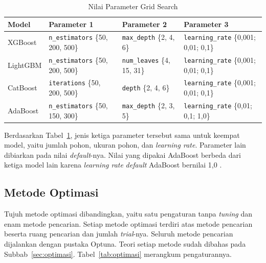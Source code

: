 \begin{table}[htbp]
  \caption{Nilai Parameter Grid Search}
  \label{tab:grid}
  \centering
  \begingroup
  \footnotesize
  \setlength{\tabcolsep}{3pt}
  \begin{tabular}{|>{\raggedright\arraybackslash}p{}%
                  |>{\raggedright\arraybackslash}p{}%
                  |>{\raggedright\arraybackslash}p{}%
                  |>{\raggedright\arraybackslash}p{}|}
    \hline
    \textbf{Model} & \textbf{Parameter 1} & \textbf{Parameter 2} &
    \textbf{Parameter 3} \\
    \hline
    XGBoost & \texttt{n\_estimators} \{50, 200, 500\} &
    \texttt{max\_depth} \{2, 4, 6\} &
    \texttt{learning\_rate} \{0,001; 0,01; 0,1\} \\
    \hline
    LightGBM & \texttt{n\_estimators} \{50, 200, 500\} &
    \texttt{num\_leaves} \{4, 15, 31\} &
    \texttt{learning\_rate} \{0,001; 0,01; 0,1\} \\
    \hline
    CatBoost & \texttt{iterations} \{50, 200, 500\} &
    \texttt{depth} \{2, 4, 6\} &
    \texttt{learning\_rate} \{0,001; 0,01; 0,1\} \\
    \hline
    AdaBoost & \texttt{n\_estimators} \{50, 150, 300\} &
    \texttt{max\_depth} \{2, 3, 5\} &
    \texttt{learning\_rate} \{0,01; 0,1; 1,0\} \\
    \hline
  \end{tabular}
  \endgroup
\end{table}

Berdasarkan Tabel~\ref{tab:grid}, jenis ketiga parameter tersebut sama untuk keempat model, yaitu jumlah pohon,
ukuran pohon, dan \textit{learning rate}. Parameter lain dibiarkan pada nilai
\textit{default}-nya. Nilai yang dipakai AdaBoost berbeda dari ketiga model
lain karena \textit{learning rate} \textit{default} AdaBoost bernilai 1,0
\cite{sklearnadaboost}.

\subsection{Metode Optimasi}
Tujuh metode optimasi dibandingkan, yaitu satu pengaturan tanpa
\textit{tuning} dan enam metode pencarian. Setiap metode optimasi terdiri atas
metode pencarian beserta ruang pencarian dan jumlah \textit{trial}-nya. Seluruh metode
pencarian dijalankan dengan pustaka Optuna. Teori setiap metode sudah dibahas
pada Subbab~\ref{sec:optimasi}. Tabel~\ref{tab:optimasi} merangkum
pengaturannya.

